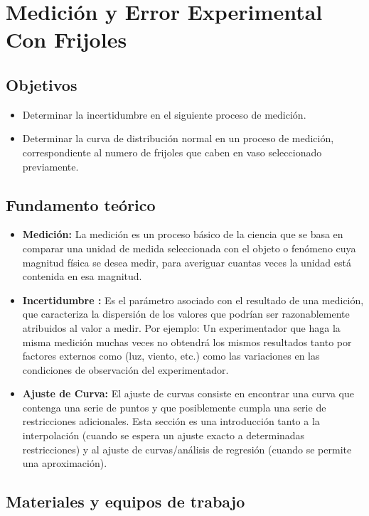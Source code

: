 \section{Medición y Error Experimental Con Frijoles}
\subsection{Objetivos}
\begin{itemize}
	\item Determinar la incertidumbre en el siguiente proceso de medición.
	\item Determinar la curva de distribución normal en un proceso de medición, correspondiente al numero de frijoles que caben en vaso seleccionado previamente.
\end{itemize}

\subsection{Fundamento teórico}
\begin{itemize}
	\item \textbf{Medición:} La medición es un proceso básico de la ciencia que se basa en comparar
	      una unidad de medida seleccionada con el objeto o fenómeno cuya magnitud física se
	      desea medir, para averiguar cuantas veces la unidad está contenida en esa magnitud.
	\item \textbf{Incertidumbre :} Es el parámetro asociado con el resultado de una medición, que
	      caracteriza la dispersión de los valores que podrían ser razonablemente atribuidos al
	      valor a medir. Por ejemplo: Un experimentador que haga la misma medición muchas
	      veces no obtendrá los mismos resultados tanto por factores externos como (luz, viento,
	      etc.) como las variaciones en las condiciones de observación del experimentador.
	\item \textbf{Ajuste de Curva: } El ajuste de curvas consiste en encontrar una curva que contenga
	      una serie de puntos y que posiblemente cumpla una serie de restricciones adicionales.
	      Esta sección es una introducción tanto a la interpolación (cuando se espera un ajuste
	      exacto a determinadas restricciones) y al ajuste de curvas/análisis de regresión (cuando
	      se permite una aproximación).
\end{itemize}
\subsection{Materiales y equipos de trabajo}

